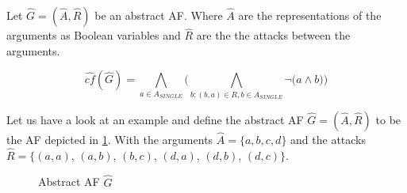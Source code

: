 \begin{definition}
    Let $\hat{G}=(\hat{A},\hat{R})$ be an abstract AF. Where $\hat{A}$ are the representations of the arguments as Boolean variables and $\hat{R}$ are the the attacks between the arguments.
    \begin{center}
        \[ \hat{cf}(\hat{G})=
        \bigwedge_{a \in A_{\!S\!I\!N\!G\!L\!E}} \bigl( \bigwedge_{b:(b,a)\in R, b \in A_{\!S\!I\!N\!G\!L\!E}} \lnot \bigl( a \wedge b \bigl) \bigl)
        \]
    \end{center}
    \label{def:booleanFormulaConflictFree}
\end{definition}


\begin{example}
    Let us have a look at an example and define the abstract AF $\hat{G} = (\hat{A}, \hat{R})$ to be the AF depicted in \cref{af:algorithmEncodingsConflictFree}. With the arguments $\hat{A}=\{a, b, c, d\}$ and the attacks $\hat{R}=\big\{ (a,a)$, $(a,b)$, $(b,c)$, $(d,a)$, $(d,b)$, $(d,c)\big\}$.

    \begin{figure}[H]
        \centering
        \caption{Abstract AF $\hat{G}$}
        \label{af:algorithmEncodingsConflictFree}
    \end{figure}


\end{example}
